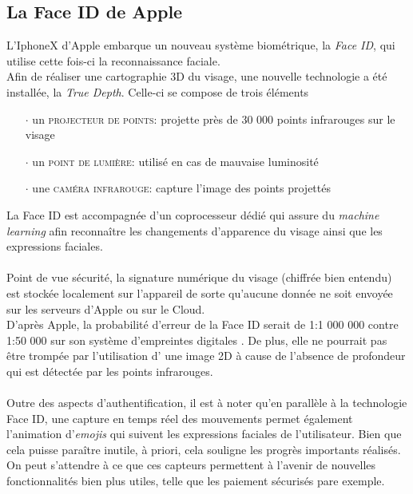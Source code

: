 \subsection{La Face ID de Apple}
L'IphoneX d'Apple embarque un nouveau système biométrique, la \textit{Face ID}, qui utilise cette fois-ci la reconnaissance faciale.
\\Afin de réaliser une cartographie 3D du visage, une nouvelle technologie a été installée, la \textit{True Depth}. Celle-ci se compose de trois éléments \cite{Xmisc_4}
\begin{itemize}
\item[$\cdot$]un \textsc{projecteur de points}: projette près de 30 000 points infrarouges sur le visage
\item[$\cdot$]un \textsc{point de lumière}: utilisé en cas de mauvaise luminosité
\item[$\cdot$]une \textsc{caméra infrarouge}: capture l'image des points projettés
\end{itemize}
La Face ID est accompagnée d'un coprocesseur dédié qui assure du \textit{machine learning} afin reconnaître les changements d'apparence du visage ainsi que les expressions faciales.

\paragraph{}Point de vue sécurité, la signature numérique du visage (chiffrée bien entendu) est stockée localement sur l'appareil de sorte qu'aucune donnée ne soit envoyée sur les serveurs d'Apple ou sur le Cloud.
\\D'après Apple, la probabilité d'erreur de la Face ID serait de 1:1 000 000 contre 1:50 000 sur son système d'empreintes digitales \cite{Xmisc_5}. De plus, elle ne pourrait pas être trompée par l'utilisation d' une image 2D à cause de l'absence de profondeur qui est détectée par les points infrarouges. 

\paragraph{}Outre des aspects d'authentification, il est à noter qu'en parallèle à la technologie Face ID, une capture en temps réel des mouvements permet également l'animation d'\textit{emojis} qui suivent les expressions faciales de l'utilisateur. Bien que cela puisse paraître inutile, à priori, cela souligne les progrès importants réalisés. On peut s'attendre à ce que ces capteurs permettent à l'avenir de nouvelles fonctionnalités bien plus utiles, telle que les paiement sécurisés pare exemple.

